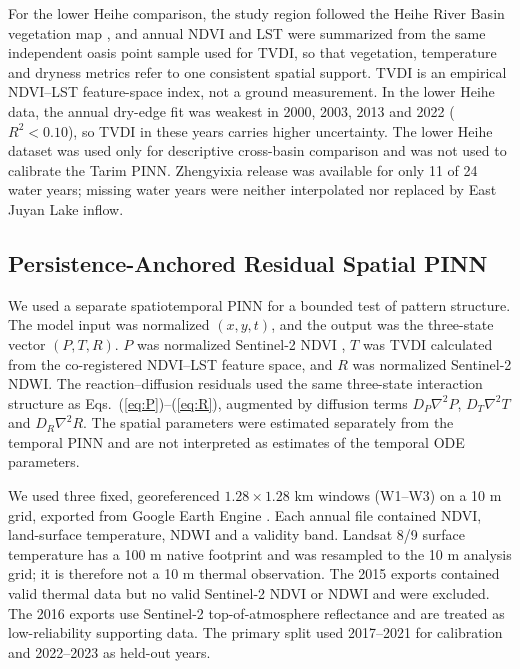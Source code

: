 \documentclass[preprint,review,12pt,3p]{elsarticle}
\begin{document}
	For the lower Heihe comparison, the study region followed the Heihe River Basin vegetation map \citep{zheng2021heihe}, and annual NDVI and LST were summarized from the same independent oasis point sample used for TVDI, so that vegetation, temperature and dryness metrics refer to one consistent spatial support. TVDI is an empirical NDVI--LST feature-space index, not a ground measurement. In the lower Heihe data, the annual dry-edge fit was weakest in 2000, 2003, 2013 and 2022 ($R^2<0.10$), so TVDI in these years carries higher uncertainty. The lower Heihe dataset was used only for descriptive cross-basin comparison and was not used to calibrate the Tarim PINN. Zhengyixia release was available for only 11 of 24 water years; missing water years were neither interpolated nor replaced by East Juyan Lake inflow.

\subsection{Persistence-Anchored Residual Spatial PINN}
\label{subsec:spatial_pinn}

We used a separate spatiotemporal PINN for a bounded test of pattern structure. The model input was normalized $(x,y,t)$, and the output was the three-state vector $(P,T,R)$. $P$ was normalized Sentinel-2 NDVI \citep{drusch2012sentinel2}, $T$ was TVDI calculated from the co-registered NDVI--LST feature space, and $R$ was normalized Sentinel-2 NDWI. The reaction--diffusion residuals used the same three-state interaction structure as Eqs.~(\ref{eq:P})--(\ref{eq:R}), augmented by diffusion terms $D_P\nabla^2P$, $D_T\nabla^2T$ and $D_R\nabla^2R$. The spatial parameters were estimated separately from the temporal PINN and are not interpreted as estimates of the temporal ODE parameters.

We used three fixed, georeferenced $1.28\times1.28$ km windows (W1--W3) on a 10 m grid, exported from Google Earth Engine \citep{gorelick2017gee}. Each annual file contained NDVI, land-surface temperature, NDWI and a validity band. Landsat 8/9 surface temperature \citep{wulder2019landsat} has a 100 m native footprint and was resampled to the 10 m analysis grid; it is therefore not a 10 m thermal observation. The 2015 exports contained valid thermal data but no valid Sentinel-2 NDVI or NDWI and were excluded. The 2016 exports use Sentinel-2 top-of-atmosphere reflectance and are treated as low-reliability supporting data. The primary split used 2017--2021 for calibration and 2022--2023 as held-out years.
\end{document}
